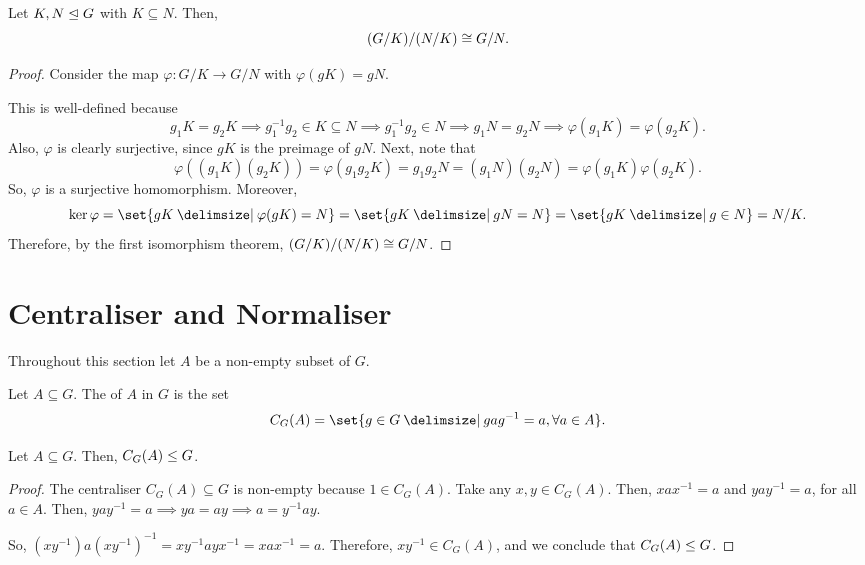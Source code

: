 \documentclass[11pt]{penrose}
\begin{document}
\begin{nthm}
    Let $K, N \mathrel{\trianglelefteq} G$ with $K \subseteq N$. Then,
    \begin{equation*}
        (G/K) / (N/K) \mathrel{\cong} G/N.
    \end{equation*}
\end{nthm}
\begin{proof}
    Consider the map $\varphi : G/K \to G/N$ with $\varphi(gK) = gN$.

    This is well-defined because
    \begin{equation*}
        g_{1}K = g_{2}K
        \implies
        g_{1}^{-1}g_{2} \in K \subseteq N
        \implies
        g_{1}^{-1}g_{2} \in N
        \implies
        g_{1}N = g_{2}N
        \implies
        \varphi(g_{1}K) = \varphi(g_{2}K).
    \end{equation*}
    Also, $\varphi$ is clearly surjective, since $gK$ is the preimage of $gN$. Next, note that
    \begin{equation*}
        \varphi( (g_{1}K)(g_{2}K) )
        = \varphi( g_{1} g_{2} K )
        = g_{1} g_{2} N
        = (g_{1}N) (g_{2}N)
        = \varphi(g_{1}K) \varphi(g_{2}K).
    \end{equation*}
    So, $\varphi$ is a surjective homomorphism. Moreover,
    \begin{equation*}
        \ker\varphi = \set{gK \st \varphi(gK) = N} = \set{gK \st gN = N} = \set{gK \st g \in N} = N/K.
    \end{equation*}
    Therefore, by the first isomorphism theorem, $(G/K) / (N/K) \mathrel{\cong} G/N$.
\end{proof}

\section{Centraliser and Normaliser}

Throughout this section let $A$ be a non-empty subset of $G$.

\begin{ndfn}[Centraliser]
    Let $A \subseteq G$. The  of $A$ in $G$ is the set
    \begin{equation*}
        C_{G}(A) = \set{ g \in G \st g a g^{-1} = a, \forall a \in A }.
    \end{equation*}
\end{ndfn}

\begin{nthm}
    Let $A \subseteq G$. Then, $C_{G}(A) \mathrel{\leq} G$.
\end{nthm}
\begin{proof}
    The centraliser $C_{G}(A) \subseteq G$ is non-empty because $1 \in C_{G}(A)$. Take any $x, y \in C_{G}(A)$. Then, $xax^{-1} = a$ and $yay^{-1} = a$, for all $a \in A$. Then, $yay^{-1} = a \implies ya = ay \implies a = y^{-1}ay$.

    So, $(xy^{-1}) a (xy^{-1})^{-1} = x y^{-1} a y x^{-1} = x a x^{-1} = a$. Therefore, $xy^{-1} \in C_{G}(A)$, and we conclude that $C_{G}(A) \mathrel{\leq} G$.
\end{proof}
\end{document}
